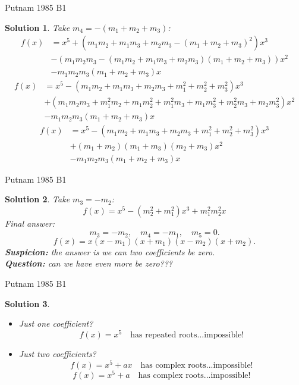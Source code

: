 \documentclass{beamer}
\newtheorem{soln}{Solution}
\begin{document}
\begin{frame}{Putnam 1985 B1}
\begin{soln}
Take $m_4 = -(m_1+m_2+m_3)$: 
{\small
\begin{align*}
f(x)
  &= x^5 + (m_1m_2 + m_1m_3  + m_2m_3 - (m_1+m_2+m_3)^2)x^3\\
  &- (m_1m_2m_3 - (m_1m_2 + m_1m_3  +  m_2m_3)(m_1+m_2+m_3))x^2\\
  & - m_1m_2m_3(m_1+m_2+m_3)x
\end{align*}
}
\pause
\vspace{-0.2in}
{\small
\begin{align*}
f(x)
  &= x^5 - (m_1m_2 + m_1m_3  + m_2m_3 + m_1^2+m_2^2+m_3^2)x^3\\
  &+ (m_1m_2m_3 + m_1^2m_2 + m_1m_2^2 + m_1^2m_3 + m_1m_3^2 + m_2^2m_3  +  m_2m_3^2)x^2\\
  & - m_1m_2m_3(m_1+m_2+m_3)x
\end{align*}
}
\pause
\vspace{-0.2in}
{\small
\begin{align*}
f(x)
  &= x^5 - (m_1m_2 + m_1m_3  + m_2m_3 + m_1^2+m_2^2+m_3^2)x^3\\
  &+ (m_1+m_2)(m_1+m_3)(m_2+m_3)x^2\\
  & - m_1m_2m_3(m_1+m_2+m_3)x
\end{align*}
}
\end{soln}
\end{frame}

\begin{frame}{Putnam 1985 B1}
\begin{soln}
Take $m_3 = -m_2$: 
$$f(x) = x^5 - (m_2^2 + m_1^2)x^3 + m_1^2m_2^2x$$
\pause
Final answer:
$$m_3 = -m_2,\quad m_4=-m_1,\quad m_5 = 0.$$
\pause
$$f(x) = x(x-m_1)(x+m_1)(x-m_2)(x+m_2).$$
\pause
\textbf{Suspicion:} the answer is we can two coefficients be zero.\\
\pause
\textbf{Question:} can we have even more be zero???
\end{soln}
\end{frame}

\begin{frame}{Putnam 1985 B1}
\begin{soln}
\begin{itemize}
\pause
\item Just one coefficient?\\
\pause
$$f(x) = x^5\quad\text{has repeated roots...impossible!}$$
\pause
\item Just two coefficients?\\
\pause
$$f(x) = x^5 + ax\quad\text{has complex roots...impossible!}$$
\pause
$$f(x) = x^5 + a\quad\text{has complex roots...impossible!}$$
\end{itemize}
\end{soln}
\end{frame}
\end{document}
